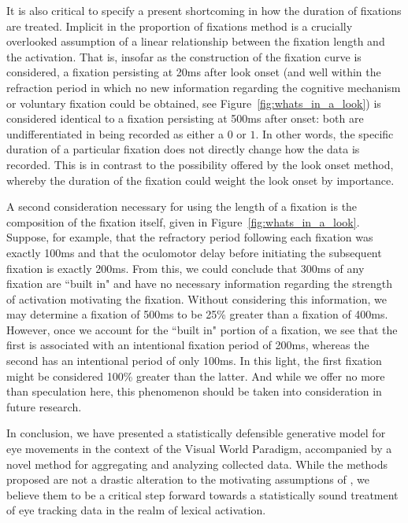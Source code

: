 \documentclass{article}
\begin{document}
It is also critical to specify a present shortcoming in how the duration of fixations are treated. Implicit in the proportion of fixations method is a crucially overlooked assumption of a linear relationship between the fixation length and the activation. That is, insofar as the construction of the fixation curve is considered, a fixation persisting at 20ms after look onset (and well within the refraction period in which no new information regarding the cognitive mechanism or voluntary fixation could be obtained, see Figure~\ref{fig:whats_in_a_look}) is considered identical to a fixation persisting at 500ms after onset: both are undifferentiated in being recorded as either a $0$ or $1$. In other words, the specific duration of a particular fixation does not directly change how the data is recorded. This is in contrast to the possibility offered by the look onset method, whereby the duration of the fixation could weight the look onset by importance.

A second consideration necessary for using the length of a fixation is the composition of the fixation itself, given in Figure~\ref{fig:whats_in_a_look}. Suppose, for example, that the refractory period following each fixation was exactly 100ms and that the oculomotor delay before initiating the subsequent fixation is exactly 200ms. From this, we could conclude that 300ms of any fixation are ``built in" and have no necessary information regarding the strength of activation motivating the fixation. Without considering this information, we may determine a fixation of 500ms to be 25\% greater than a fixation of 400ms. However, once we account for the ``built in" portion of a fixation, we see that the first is associated with an intentional fixation period of 200ms, whereas the second has an intentional period of only 100ms. In this light, the first fixation might be considered 100\% greater than the latter. And while we offer no more than speculation here, this phenomenon should be taken into consideration in future research.

In conclusion, we have presented a statistically defensible generative model for eye movements in the context of the Visual World Paradigm, accompanied by a novel method for aggregating and analyzing collected data. While the methods proposed are not a drastic alteration to the motivating assumptions of \citet{allopenna1998tracking}, we believe them to be a critical step forward towards a statistically sound treatment of eye tracking data in the realm of lexical activation.
\end{document}
